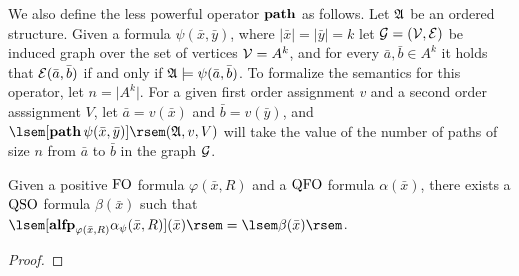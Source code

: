 We also define the less powerful operator ${\bf path}$ as follows. Let $\mathfrak{A}$ be an ordered structure. Given a formula $\psi(\bar{x},\bar{y})$, where $\vert \bar{x} \vert = \vert \bar{y} \vert = k$ let ${\cal G} = ({\cal V},\cal{E})$ be induced graph over the set of vertices ${\cal V} = A^k$, and for every $\bar{a},\bar{b}\in A^k$ it holds that ${\cal E}(\bar{a},\bar{b})$ if and only if $\mathfrak{A} \models \psi(\bar{a},\bar{b})$. To formalize the semantics for this operator, let $n = \vert A^k \vert$.
For a given first order assignment $v$ and a second order asssignment $V$, let $\bar{a} = v(\bar{x})$ and $\bar{b} = v(\bar{y})$, and $\sem{[\pth\, \psi(\bar{x},\bar{y})]}(\A,v,V)$ will take the value of the number of paths of size $n$ from $\bar{a}$ to $\bar{b}$ in the graph ${\cal G}$.

\begin{theorem}
	Given a positive ${\rm FO}$ formula $\varphi(\bar{x},R)$ and a ${\rm QFO}$ formula $\alpha(\bar{x})$, there exists a ${\rm QSO}$ formula $\beta(\bar{x})$ such that $\sem{[\alfp_{\varphi(\bar{x},R)} \alpha_{\psi}(\bar{x},R)](\bar{x})} = \sem{\beta(\bar{x})}$.
\end{theorem}
\begin{proof}
	
\end{proof}
